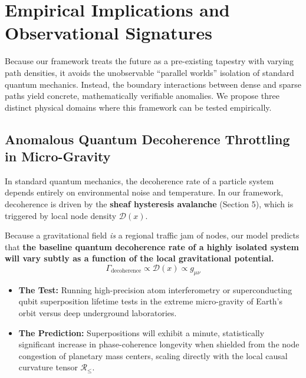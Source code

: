 \documentclass[12pt,letterpaper]{article}
\begin{document}
\section{Empirical Implications and Observational Signatures}

Because our framework treats the future as a pre-existing tapestry with varying path densities, it avoids the unobservable ``parallel worlds'' isolation of standard quantum mechanics. Instead, the boundary interactions between dense and sparse paths yield concrete, mathematically verifiable anomalies. We propose three distinct physical domains where this framework can be tested empirically.

\subsection{Anomalous Quantum Decoherence Throttling in Micro-Gravity}
In standard quantum mechanics, the decoherence rate of a particle system depends entirely on environmental noise and temperature. In our framework, decoherence is driven by the \textbf{sheaf hysteresis avalanche} (Section 5), which is triggered by local node density $\mathcal{D}(x)$.

Because a gravitational field \textit{is} a regional traffic jam of nodes, our model predicts that \textbf{the baseline quantum decoherence rate of a highly isolated system will vary subtly as a function of the local gravitational potential.}
$$\Gamma_{\text{decoherence}} \propto \mathcal{D}(x) \propto g_{\mu\nu}$$
\begin{itemize}
    \item \textbf{The Test:} Running high-precision atom interferometry or superconducting qubit superposition lifetime tests in the extreme micro-gravity of Earth's orbit versus deep underground laboratories.
    \item \textbf{The Prediction:} Superpositions will exhibit a minute, statistically significant increase in phase-coherence longevity when shielded from the node congestion of planetary mass centers, scaling directly with the local causal curvature tensor $\mathcal{R}_{\le}$.
\end{itemize}
\end{document}
